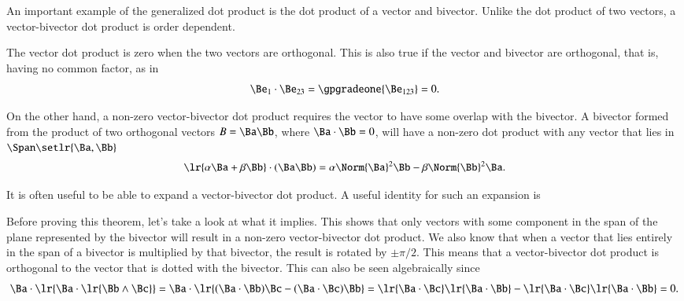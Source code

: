 %
%

An important example of the generalized dot product is the dot product of a vector and bivector.
Unlike the dot product of two vectors, a vector-bivector dot product is order dependent.

The vector dot product is zero when the two vectors are orthogonal.
This is also true if the vector and bivector are orthogonal, that is, having no common factor, as in
\begin{equation}\label{eqn:generalizedDot_vectorBivector:661}
\Be_1 \cdot \Be_{23} = \gpgradeone{ \Be_{123} } = 0.
\end{equation}

On the other hand, a non-zero vector-bivector dot product requires the vector to have some overlap with the bivector.
A bivector formed from the product of two orthogonal vectors \( B = \Ba \Bb \), where \( \Ba \cdot \Bb = 0 \), will have a non-zero dot product with any vector that lies in \( \Span \setlr{ \Ba, \Bb} \)
\begin{dmath}\label{eqn:generalizedDot_vectorBivector:682}
\lr{ \alpha \Ba + \beta \Bb } \cdot (\Ba\Bb)
=
\alpha \Norm{\Ba}^2 \Bb - \beta \Norm{\Bb}^2 \Ba.
\end{dmath}

It is often useful to be able to expand a vector-bivector dot product.
A useful identity for such an expansion is


Before proving this theorem, let's take a look at what it implies.
This shows that only vectors with some component in the span of the plane represented by the bivector will result in a non-zero vector-bivector dot product.
We also know that when a vector that lies entirely in the span of a bivector is multiplied by that bivector, the result is rotated by \( \pm \pi/2 \).
This means that a vector-bivector dot product is orthogonal to the vector that is dotted with the bivector.
This can also be seen algebraically since
\begin{dmath}\label{eqn:generalizedDot_vectorBivector:1120}
\Ba \cdot \lr{ \Ba \cdot \lr{ \Bb \wedge \Bc }}
=
\Ba \cdot \lr{ ( \Ba \cdot \Bb ) \Bc -( \Ba \cdot \Bc ) \Bb }
=
\lr{ \Ba \cdot \Bc } \lr{ \Ba \cdot \Bb } - \lr{ \Ba \cdot \Bc } \lr{ \Ba \cdot \Bb }
= 0.
\end{dmath}


